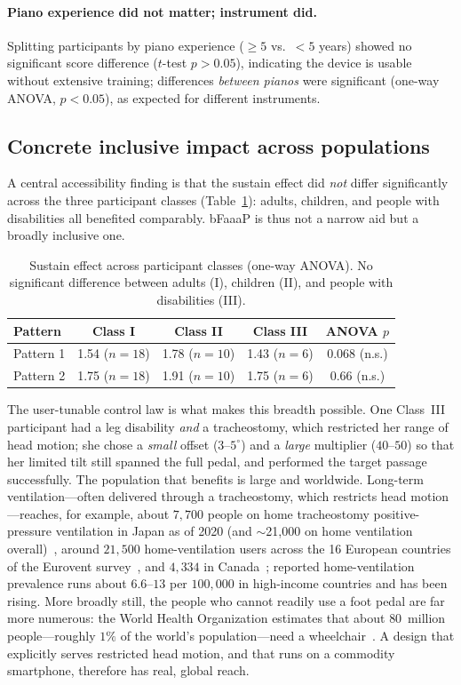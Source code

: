 \paragraph{Piano experience did not matter; instrument did.}
Splitting participants by piano experience ($\ge5$ vs.\ $<5$ years) showed no
significant score difference ($t$-test $p>0.05$), indicating the device is usable
without extensive training; differences \emph{between pianos} were significant
(one-way ANOVA, $p<0.05$), as expected for different instruments.

\subsection{Concrete inclusive impact across populations}
\label{sec:impact}
A central accessibility finding is that the sustain effect did \emph{not} differ
significantly across the three participant classes (Table~\ref{tab:classes}):
adults, children, and people with disabilities all benefited comparably. bFaaaP is
thus not a narrow aid but a broadly inclusive one.

\begin{table}[tbp]
\caption{Sustain effect across participant classes (one-way ANOVA). No significant
difference between adults (I), children (II), and people with disabilities (III).}
\label{tab:classes}
\small
\begin{tabular}{@{}lcccc@{}}
\toprule
Pattern & Class I & Class II & Class III & ANOVA $p$ \\
\midrule
Pattern 1 & 1.54 ($n{=}18$) & 1.78 ($n{=}10$) & 1.43 ($n{=}6$) & 0.068 (n.s.) \\
Pattern 2 & 1.75 ($n{=}18$) & 1.91 ($n{=}10$) & 1.75 ($n{=}6$) & 0.66 (n.s.) \\
\bottomrule
\end{tabular}
\end{table}

The user-tunable control law is what makes this breadth possible. One Class~III
participant had a leg disability \emph{and} a tracheostomy, which restricted her
range of head motion; she chose a \emph{small} offset ($3$--$5^\circ$) and a
\emph{large} multiplier ($40$--$50$) so that her limited tilt still spanned the
full pedal, and performed the target passage successfully. The population that
benefits is large and worldwide. Long-term ventilation---often delivered through a
tracheostomy, which restricts head motion---reaches, for example, about $7{,}700$
people on home tracheostomy positive-pressure ventilation in Japan as of 2020 (and
$\sim$21{,}000 on home ventilation overall)~\cite{hmv_japan2020}, around $21{,}500$
home-ventilation users across the 16 European countries of the Eurovent
survey~\cite{eurovent2005}, and $4{,}334$ in Canada~\cite{hmv_canada2015}; reported
home-ventilation prevalence runs about $6.6$--$13$ per $100{,}000$ in high-income
countries and has been rising. More broadly still, the people who cannot readily use
a foot pedal are far more numerous: the World Health Organization estimates that
about $80$~million people---roughly $1\%$ of the world's population---need a
wheelchair~\cite{who_wheelchair2023}. A design that explicitly serves restricted head
motion, and that runs on a commodity smartphone, therefore has real, global reach.


